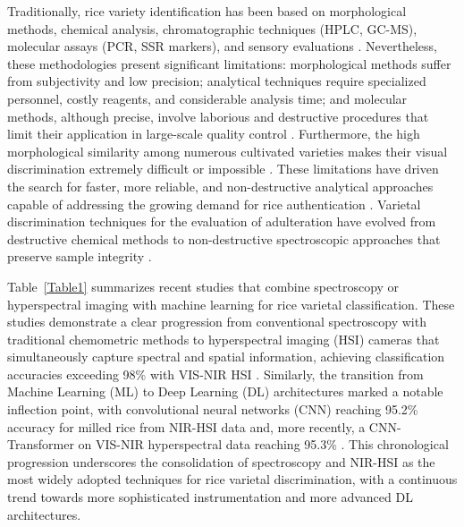 \documentclass[final,5p,times,twocolumn]{elsarticle}
\begin{document}
Traditionally, rice variety identification has been based on morphological methods, chemical analysis, chromatographic techniques (HPLC, GC-MS), molecular assays (PCR, SSR markers), and sensory evaluations \citep{Shi2025, Sampaio2019, Giang2020b}. 
Nevertheless, these methodologies present significant limitations: morphological methods suffer from subjectivity and low precision; analytical techniques require specialized personnel, costly reagents, and considerable analysis time; and molecular methods, although precise, involve laborious and destructive procedures that limit their application in large-scale quality control \citep{Rahmani2022, Giang2020b}. 
Furthermore, the high morphological similarity among numerous cultivated varieties makes their visual discrimination extremely difficult or impossible \citep{Onmarkhong2022, Tong2021, Shi2022}. 
These limitations have driven the search for faster, more reliable, and non-destructive analytical approaches capable of addressing the growing demand for rice authentication \citep{Shi2025, Dehbasteh2025, Cazzaniga2026}. 
Varietal discrimination techniques for the evaluation of adulteration have evolved from destructive chemical methods to non-destructive spectroscopic approaches that preserve sample integrity \citep{Weng2020, Kang2024, Zhao2024}.


Table~\ref{Table1} summarizes recent studies that combine spectroscopy or hyperspectral imaging with machine learning for rice varietal classification. 
These studies demonstrate a clear progression from conventional spectroscopy with traditional chemometric methods \citep{Shi2022, Tong2021} to hyperspectral imaging (HSI) cameras that simultaneously capture spectral and spatial information, achieving classification accuracies exceeding 98\% with VIS-NIR HSI \citep{Weng2020}. 
Similarly, the transition from Machine Learning (ML) to Deep Learning (DL) architectures marked a notable inflection point, with convolutional neural networks (CNN) reaching 95.2\% accuracy for milled rice from NIR-HSI data \citep{Onmarkhong2022} and, more recently, a CNN-Transformer on VIS-NIR hyperspectral data reaching 95.3\% \citep{Zhang2025}. 
This chronological progression underscores the consolidation of spectroscopy and NIR-HSI as the most widely adopted techniques for rice varietal discrimination, with a continuous trend towards more sophisticated instrumentation and more advanced DL architectures.
\end{document}
